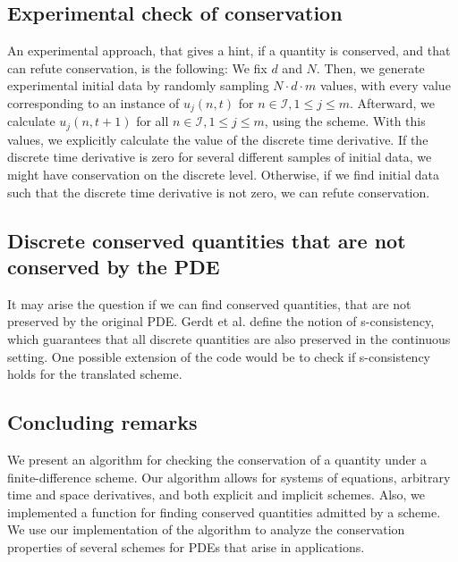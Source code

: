 \documentclass[manuscript]{acmart}
\newcommand{\1}{{\chi}}
\newcommand{\Ii}{{\mathcal{I}}}
\numberwithin{equation}{section}
\theoremstyle{thmlemcorr}
\numberwithin{theorem}{section}
\theoremstyle{thmlemcorr*}
\theoremstyle{defi}
\theoremstyle{remexample}
\theoremstyle{ass}
\begin{document}
\subsection{Experimental check of conservation}
An experimental approach, that gives a hint, if a quantity is conserved, and that can refute conservation, is the following:
We fix $d$ and $N$. Then, we generate experimental initial data by randomly sampling $N\cdot d\cdot m$ values, with every value corresponding to an instance of $u_j(n,t)$ for $n\in\Ii,1\leq j\leq m$. Afterward, we calculate $u_j(n,t+1)$ for all $n\in\Ii,1\leq j\leq m$, using the scheme. With this values, we explicitly calculate the value of the discrete time derivative.
If the discrete time derivative is zero for several different samples of initial data, we might have conservation on the discrete level. Otherwise, if we find initial data such that the discrete time derivative is not zero, we can refute conservation.\\
\subsection{Discrete conserved quantities that are not conserved by the PDE}
It may arise the question if we can find conserved quantities, that are not preserved by the original PDE. Gerdt et al. \cite{gerdt10,gerdt12} define the notion of s-consistency, which guarantees that all discrete quantities are also preserved in the continuous setting. One possible extension of the code would be to check if s-consistency holds for the translated scheme.\\
\subsection{Concluding remarks}
We present an algorithm for checking the conservation of a quantity under a finite-difference scheme. Our algorithm allows for systems of equations, arbitrary time and space derivatives, and both explicit and implicit schemes. Also, we implemented a function for finding conserved quantities admitted by a scheme. We use our implementation of the algorithm to analyze the conservation properties of several schemes for PDEs that arise in applications.



\end{document}
